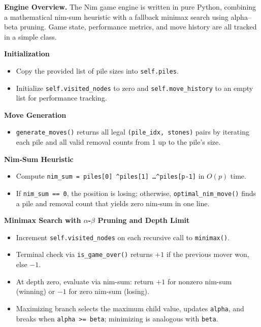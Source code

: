 \documentclass[12pt]{article}
\begin{document}
\noindent\textbf{Engine Overview.}  
The Nim game engine is written in pure Python, combining a mathematical nim-sum heuristic with a fallback minimax search using alpha–beta pruning. Game state, performance metrics, and move history are all tracked in a simple class.

\vspace{1em}

\noindent\textbf{Initialization}
\begin{itemize}
  \item Copy the provided list of pile sizes into \texttt{self.piles}.  
  \item Initialize \texttt{self.visited\_nodes} to zero and \texttt{self.move\_history} to an empty list for performance tracking.
\end{itemize}

\noindent\textbf{Move Generation}
\begin{itemize}
  \item \texttt{generate\_moves()} returns all legal \texttt{(pile\_idx, stones)} pairs by iterating each pile and all valid removal counts from 1 up to the pile’s size.
\end{itemize}

\noindent\textbf{Nim‑Sum Heuristic}
\begin{itemize}
  \item Compute \texttt{nim\_sum = piles[0] \textasciicircum piles[1] \dots \textasciicircum piles[p-1]} in $O(p)$ time.
  \item If \texttt{nim\_sum == 0}, the position is losing; otherwise, \texttt{optimal\_nim\_move()} finds a pile and removal count that yields zero nim-sum in one line.
\end{itemize}

\noindent\textbf{Minimax Search with \(\alpha\)-\(\beta\) Pruning and Depth Limit}
\begin{itemize}
  \item Increment \texttt{self.visited\_nodes} on each recursive call to \texttt{minimax()}.
  \item Terminal check via \texttt{is\_game\_over()} returns $+1$ if the previous mover won, else $-1$.
  \item At depth zero, evaluate via nim-sum: return $+1$ for nonzero nim-sum (winning) or $-1$ for zero nim-sum (losing).
  \item Maximizing branch selects the maximum child value, updates \texttt{alpha}, and breaks when \texttt{alpha >= beta}; minimizing is analogous with \texttt{beta}.
\end{itemize}
\end{document}
